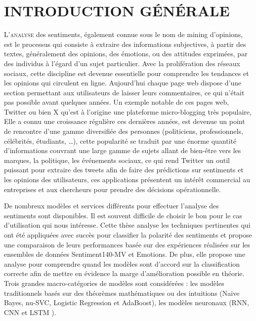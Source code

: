 \clearpage
{}
{}
\chapter*{INTRODUCTION GÉNÉRALE}

\lettrine[lines=3,lraise=0.1,findent=0.6em]{L'}{analyse} des sentiments, également connue sous le nom de mining d’opinions, est le processus qui consiste à extraire des informations subjectives, à partir des textes, généralement des opinions, des émotions, ou des attitudes exprimées, par des individus à l’égard d’un sujet particulier. Avec la prolifération des réseaux sociaux, cette discipline est devenue essentielle pour comprendre les tendances et les opinions qui circulent en ligne. Aujourd’hui chaque page web dispose d’une section permettant aux utilisateurs de laisser leurs commentaires, ce qui n’était pas possible avant quelques années. Un exemple notable de ces pages web, Twitter ou bien X qu’est à l’origine une plateforme micro-blogging très populaire, Elle a connu une croissance régulière ces dernières années, est devenue un point de rencontre d’une gamme diversifiée des personnes (politiciens, professionnels, célébrités, étudiants, …), cette popularité se traduit par une énorme quantité d’informations couvrant une large gamme de sujets allant de bien-être vers les marques, la politique, les événements sociaux, ce qui rend Twitter un outil puissant pour extraire des tweets afin de faire des prédictions sur sentiments et les opinions des utilisateurs, ces applications présentent un intérêt commercial au entreprises et aux chercheurs pour prendre des décisions opérationnelle.


De nombreux modèles et services différents pour effectuer l'analyse des sentiments sont disponibles. Il est souvent difficile de choisir le bon pour le cas d'utilisation qui nous intéresse. Cette thèse analyse les techniques pertinentes qui ont été appliquées avec succès pour classifier la polarité des sentiments et propose une comparaison de leurs performances basée sur des expériences réalisées sur les ensembles de données Sentiment140-MV et Emotions. De plus, elle propose une analyse pour comprendre quand les modèles sont d'accord sur la classification correcte afin de mettre en évidence la marge d'amélioration possible en théorie. Trois grandes macro-catégories de modèles sont considérées : les modèles traditionnels basés sur des théorèmes mathématiques ou des intuitions (Naive Bayes, nu-SVC, Logistic Regression et AdaBoost), les modèles neuronaux (RNN, CNN et LSTM ). 

